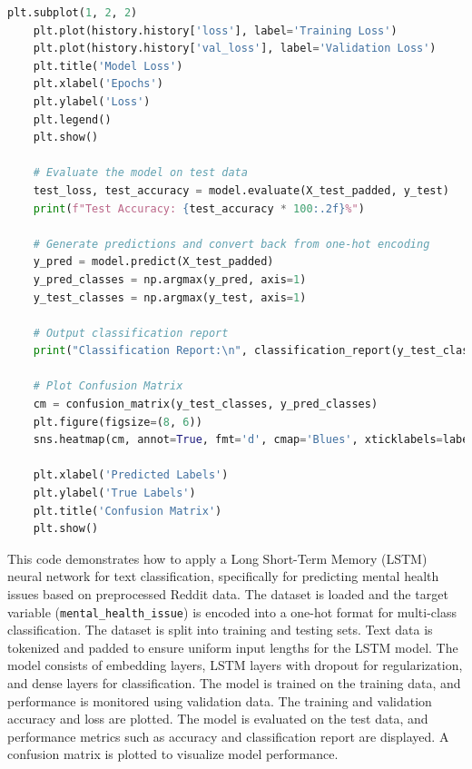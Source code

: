 \begin{tcolorbox}[colback=gray!5!white, colframe=gray!80!black, boxrule=0.5pt, title=LSTM Model Implementation]
    \begin{lstlisting}[language=Python]
    plt.subplot(1, 2, 2)
    plt.plot(history.history['loss'], label='Training Loss')
    plt.plot(history.history['val_loss'], label='Validation Loss')
    plt.title('Model Loss')
    plt.xlabel('Epochs')
    plt.ylabel('Loss')
    plt.legend()
    plt.show()

    # Evaluate the model on test data
    test_loss, test_accuracy = model.evaluate(X_test_padded, y_test)
    print(f"Test Accuracy: {test_accuracy * 100:.2f}%")

    # Generate predictions and convert back from one-hot encoding
    y_pred = model.predict(X_test_padded)
    y_pred_classes = np.argmax(y_pred, axis=1)
    y_test_classes = np.argmax(y_test, axis=1)

    # Output classification report
    print("Classification Report:\n", classification_report(y_test_classes, y_pred_classes, target_names=label_encoder.classes_))

    # Plot Confusion Matrix
    cm = confusion_matrix(y_test_classes, y_pred_classes)
    plt.figure(figsize=(8, 6))
    sns.heatmap(cm, annot=True, fmt='d', cmap='Blues', xticklabels=label_encoder.classes_, yticklabels=label_encoder.classes_)

    plt.xlabel('Predicted Labels')
    plt.ylabel('True Labels')
    plt.title('Confusion Matrix')
    plt.show()
\end{lstlisting}
\end{tcolorbox}

\noindent
This code demonstrates how to apply a Long Short-Term Memory (LSTM) neural network for text classification, specifically for predicting mental health issues based on preprocessed Reddit data. The dataset is loaded and the target variable (\texttt{mental\_health\_issue}) is encoded into a one-hot format for multi-class classification. The dataset is split into training and testing sets. Text data is tokenized and padded to ensure uniform input lengths for the LSTM model. The model consists of embedding layers, LSTM layers with dropout for regularization, and dense layers for classification. The model is trained on the training data, and performance is monitored using validation data. The training and validation accuracy and loss are plotted. The model is evaluated on the test data, and performance metrics such as accuracy and classification report are displayed. A confusion matrix is plotted to visualize model performance.


